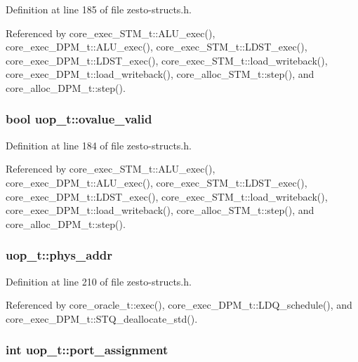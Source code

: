 Definition at line 185 of file zesto-structs.h.

Referenced by core\_\-exec\_\-STM\_\-t::ALU\_\-exec(), core\_\-exec\_\-DPM\_\-t::ALU\_\-exec(), core\_\-exec\_\-STM\_\-t::LDST\_\-exec(), core\_\-exec\_\-DPM\_\-t::LDST\_\-exec(), core\_\-exec\_\-STM\_\-t::load\_\-writeback(), core\_\-exec\_\-DPM\_\-t::load\_\-writeback(), core\_\-alloc\_\-STM\_\-t::step(), and core\_\-alloc\_\-DPM\_\-t::step().
\subsubsection[{ovalue\_\-valid}]{\setlength{\rightskip}{0pt plus 5cm}bool {\bf uop\_\-t::ovalue\_\-valid}}\label{structuop__t_81fdd7fda39dcc7d7d349ffe8add49b2}




Definition at line 184 of file zesto-structs.h.

Referenced by core\_\-exec\_\-STM\_\-t::ALU\_\-exec(), core\_\-exec\_\-DPM\_\-t::ALU\_\-exec(), core\_\-exec\_\-STM\_\-t::LDST\_\-exec(), core\_\-exec\_\-DPM\_\-t::LDST\_\-exec(), core\_\-exec\_\-STM\_\-t::load\_\-writeback(), core\_\-exec\_\-DPM\_\-t::load\_\-writeback(), core\_\-alloc\_\-STM\_\-t::step(), and core\_\-alloc\_\-DPM\_\-t::step().
\subsubsection[{phys\_\-addr}]{ {\bf uop\_\-t::phys\_\-addr}}\label{structuop__t_fdd71edb53caa0d97b0947644ebfcfc1}




Definition at line 210 of file zesto-structs.h.

Referenced by core\_\-oracle\_\-t::exec(), core\_\-exec\_\-DPM\_\-t::LDQ\_\-schedule(), and core\_\-exec\_\-DPM\_\-t::STQ\_\-deallocate\_\-std().
\subsubsection[{port\_\-assignment}]{\setlength{\rightskip}{0pt plus 5cm}int {\bf uop\_\-t::port\_\-assignment}}\label{structuop__t_09b2c63be80dd4e8800c1b59d0155b8e}




